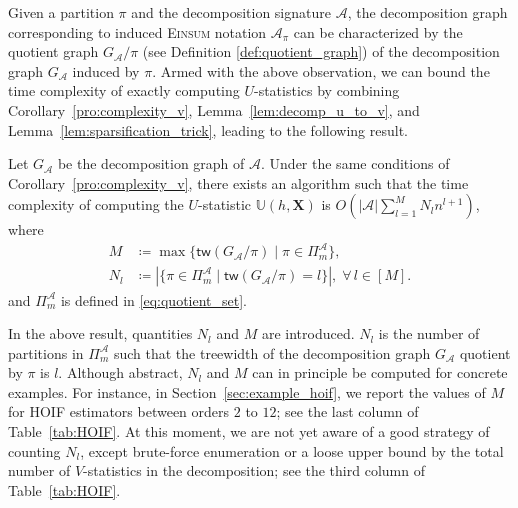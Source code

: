 \documentclass[twoside,11pt]{article}
\def\Einsum{\textsc{Einsum}}
\newcommand{\ustat}{\mathbb{U}}
\newcommand{\ustatp}[2]{\ustat(#1,#2)}
\newcommand{\partition}{\Pi}
\newcommand{\partitionp}[1]{\partition_{#1}}
\newcommand{\treewidthp}[1]{\mathsf{tw}(#1)}
\newcommand{\less}{O}
\def\calA{\mathcal{A}}
\begin{document}

Given a partition $\pi$ and the decomposition signature $\calA$, the decomposition graph corresponding to induced \Einsum{} notation $\calA_\pi$ can be characterized by the quotient graph $G_\calA / \pi$ (see Definition \ref{def:quotient_graph}) of the decomposition graph $G_\calA$ induced by $\pi$. Armed with the above observation, we can bound the time complexity of exactly computing $U$-statistics by combining Corollary~\ref{pro:complexity_v}, Lemma~\ref{lem:decomp_u_to_v}, and Lemma~\ref{lem:sparsification_trick}, leading to the following result.

\begin{corollary}
\label{cor:U}
Let $G_\calA$ be the decomposition graph of $\calA$.
Under the same conditions of Corollary~\ref{pro:complexity_v}, there exists an algorithm such that the time complexity of computing the $U$-statistic $\ustatp{h}{\bm{X}}$ is $\less(|\calA| \sum_{l = 1}^{M} N_{l} n^{l + 1})$, where 
\begin{align*}
M  & \coloneqq \max\{\treewidthp{G_\calA /\pi} \mid \pi \in \partitionp{m}^\calA \}, \\
N_{l} & \coloneqq |\{\pi \in \Pi_{m}^{\calA} \mid \treewidthp{G_{\calA} / \pi} = l\}|, \; \forall \, l 
\in [M].
\end{align*}
and $\partitionp{m}^\calA$ is defined in \eqref{eq:quotient_set}.
\end{corollary}

\begin{remark}
\label{rem:U-complexity}
In the above result, quantities $N_{l}$ and $M$ are introduced. $N_{l}$ is the number of partitions in $\Pi_{m}^{\calA}$ such that the treewidth of the decomposition graph $G_{\calA}$ quotient by $\pi$ is $l$. Although abstract, $N_{l}$ and $M$ can in principle be computed for concrete examples. For instance, in Section~\ref{sec:example_hoif}, we report the values of $M$ for HOIF estimators between orders $2$ to $12$; see the last column of Table~\ref{tab:HOIF}. At this moment, we are not yet aware of a good strategy of counting $N_{l}$, except brute-force enumeration or a loose upper bound by the total number of $V$-statistics in the decomposition; see the third column of Table~\ref{tab:HOIF}.
\end{remark}
\end{document}
